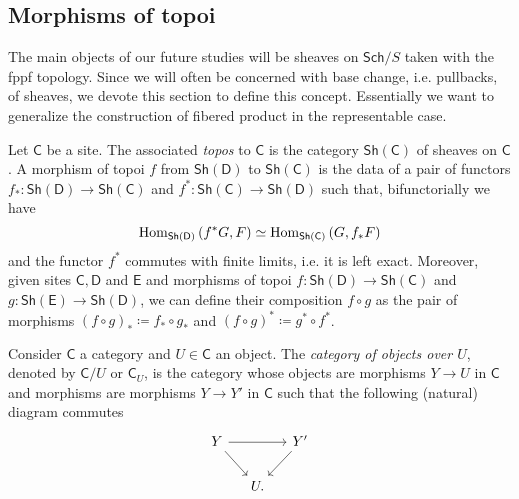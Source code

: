 \subsection{Morphisms of topoi}
The main objects of our future studies will be sheaves on
$\mathsf{Sch}/S$ taken with the fppf topology.
Since we will often be concerned with base change, i.e. pullbacks,
of sheaves, we devote this section to define this concept.
Essentially we want to generalize the construction
of fibered product in the representable case.


\begin{defn}[Topoi]
	Let $\mathsf{C}$ be a site.
	The associated \emph{topos} to $\mathsf{C}$ is the category $\mathsf{Sh}\left(\mathsf{C}\right)$
	of sheaves on $\mathsf{C}$.
	A morphism of topoi $f$ from $\mathsf{Sh}\left(\mathsf{D}\right)$
	to $\mathsf{Sh}\left(\mathsf{C}\right)$ is the data of a pair
	of functors $f_*\colon \mathsf{Sh}\left(\mathsf{D}\right) \to \mathsf{Sh}\left(\mathsf{C}\right)$
	and $f^*\colon \mathsf{Sh}\left(\mathsf{C}\right) \to \mathsf{Sh}\left(\mathsf{D}\right)$
	such that, bifunctorially we have
	\begin{equation*}
		\operatorname{Hom}_{\mathsf{Sh}(\mathsf{D})} \left( f^*G, F \right) \simeq
		\operatorname{Hom}_{\mathsf{Sh}(\mathsf{C})} \left( G, f_*F \right) 
	\end{equation*}
	and the functor $f^*$ commutes with finite limits, i.e. it
	is left exact.
	Moreover, given sites $\mathsf{C}, \mathsf{D}$ and $\mathsf{E}$
	and morphisms of topoi 
	$f\colon \mathsf{Sh}\left(\mathsf{D}\right) \to \mathsf{Sh}\left(\mathsf{C}\right)$ and
	$g\colon \mathsf{Sh}\left(\mathsf{E}\right) \to \mathsf{Sh}\left(\mathsf{D}\right)$,
	we can define their composition $f \circ g$
	as the pair of morphisms $\left( f \circ g \right)_* \coloneqq f_* \circ g_*$
	and $\left( f \circ g \right)^* \coloneqq g^* \circ f^*$.
\end{defn}


\begin{defn}
	Consider $\mathsf{C}$ a category and $U \in \mathsf{C}$ an object.
	The \emph{category of objects over $U$}, denoted by $\mathsf{C}/U$
	or $\mathsf{C}_U$, is the category whose objects are morphisms
	$Y \to U$ in $\mathsf{C}$ and morphisms are morphisms $Y \to Y'$
	in $\mathsf{C}$ such that the following (natural) diagram commutes
	\begin{equation*}
	\begin{tikzcd}[column sep=1.2em]
		Y \arrow[rr, "", rightarrow] 
		\arrow[rd, "", rightarrow] & &
		Y' \arrow[ld, "", rightarrow] \\
		&
		U
	.\end{tikzcd}
	\end{equation*}
\end{defn}


